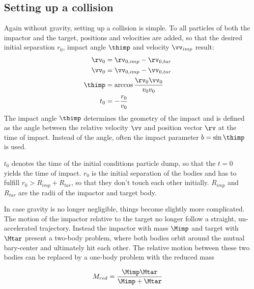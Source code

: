 \subsection{Setting up a collision}
Again without gravity, setting up a collision is simple. To all particles of both the impactor and the target, positions and velocities are added, so that the desired initial separation $r_0$, impact angle $\thimp$ and velocity $\vv_{imp}$ result:
\begin{align}
\label{ch02_aux_eq002}
\rv_0 &= \rv_{0,imp} -  \rv_{0,tar} \\
\vv_0 &= \vv_{0,imp} -  \vv_{0,tar} \\
\thimp &= \arccos{ \frac{\rv_0 \vv_0}{v_0 v_0} }\\
t_0 &= - \frac{r_0}{v_0}
\end{align}
The impact angle $\thimp$ determines the geometry of the impact and is defined as the angle between the relative velocity $\vv$ and position vector $\rv$ at the time of impact. Instead of the angle, often the impact parameter $b = \sin{\thimp}$ is used.

$t_0$ denotes the time of the initial conditions particle dump, so that the $t = 0$ yields the time of impact. $r_0$ is the initial separation of the bodies and has to fulfill $r_0 > R_{imp} + R_{tar}$, so that they don't touch each other initially. $R_{imp}$ and $R_{tar}$ are the radii of the impactor and target body.

In case gravity is no longer negligible, things become slightly more complicated. The motion of the impactor relative to the target no longer follow a straight, un-accelerated trajectory. Instead the impactor with mass $\Mimp$ and target with $\Mtar$ present a two-body problem, where both bodies orbit around the mutual bary-center and ultimately hit each other. The relative motion between these two bodies can be replaced by a one-body problem with the reduced mass

\begin{align}
\label{ch02_aux_eq003}
M_{red} = \frac{\Mimp \Mtar}{\Mimp + \Mtar}
\end{align}

